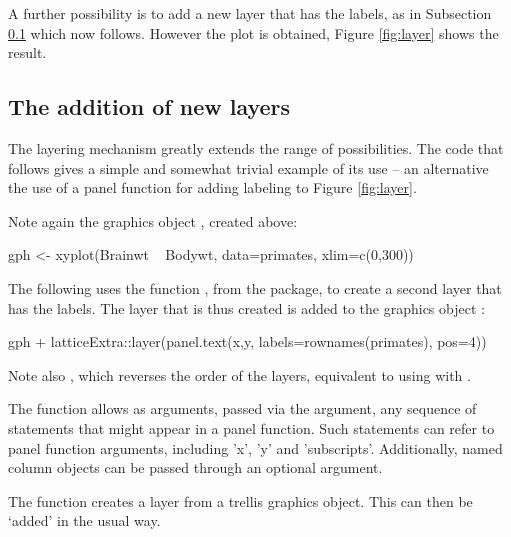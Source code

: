 A further possibility is to add a new layer that has the labels, as
in Subsection \ref{ss:layer} which now follows.
However the plot is obtained, Figure \ref{fig:layer} shows the result.

\subsection{The addition of new layers}\label{ss:layer}
The layering mechanism greatly extends the range of possibilities.
The code that follows gives a simple and somewhat trivial example
of its use -- an alternative the use of a panel function for adding
labeling to Figure \ref{fig:layer}.

Note again the graphics object , created above:
\begin{Schunk}
\begin{Sinput}
gph <- xyplot(Brainwt ~ Bodywt,  data=primates,
              xlim=c(0,300))
\end{Sinput}
\end{Schunk}
\noindent
The following uses the function , from the
 package, to create a second layer that has the
labels. The layer that is thus created is added to the graphics object
:
\begin{Schunk}
\begin{Sinput}
gph + latticeExtra::layer(panel.text(x,y,
                       labels=rownames(primates),
                       pos=4))
\end{Sinput}
\end{Schunk}
\noindent Note also
, which reverses the order of the layers,
equivalent to using  with .

The function  allows as arguments,
passed via the \code{\ldots} argument, any sequence of statements
that might appear in a panel function.  Such statements can refer to
panel function arguments, including 'x', 'y' and 'subscripts'.
Additionally, named column objects can be passed through an optional
 argument.

The function  creates a layer from a trellis graphics
object.  This can then be `added' in the usual way.

